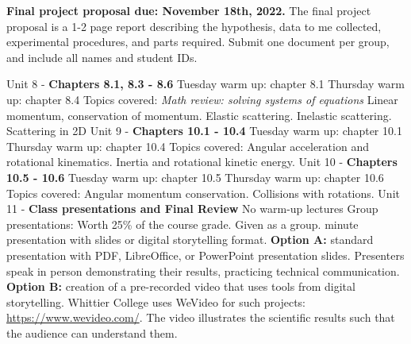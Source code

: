 \documentclass[10pt]{article}
\begin{document}
\begin{outline}[enumerate]
\1 \textbf{Final project proposal due: November 18th, 2022.}  The final project proposal is a 1-2 page report describing the hypothesis, data to me collected, experimental procedures, and parts required.  Submit one document per group, and include all names and student IDs.

\1 Unit 8 - \textbf{Chapters 8.1, 8.3 - 8.6}
\2 Tuesday warm up: chapter 8.1
\2 Thursday warm up: chapter 8.4
\2 Topics covered:
\3 \textit{Math review: solving systems of equations}
\3 Linear momentum, conservation of momentum.
\3 Elastic scattering.
\3 Inelastic scattering.
\3 Scattering in 2D
\1 Unit 9 - \textbf{Chapters 10.1 - 10.4}
\2 Tuesday warm up: chapter 10.1
\2 Thursday warm up: chapter 10.4
\2 Topics covered:
\3 Angular acceleration and rotational kinematics.
\3 Inertia and rotational kinetic energy.
\1 Unit 10 - \textbf{Chapters 10.5 - 10.6}
\2 Tuesday warm up: chapter 10.5
\2 Thursday warm up: chapter 10.6
\2 Topics covered:
\3 Angular momentum conservation.
\3 Collisions with rotations.
\1 Unit 11 - \textbf{Class presentations and Final Review}
\2 No warm-up lectures
\2 Group presentations:
\3 Worth 25\% of the course grade.
\3 Given as a group.
 minute presentation with slides or digital storytelling format.
\3 \textbf{Option A:} standard presentation with PDF, LibreOffice, or PowerPoint presentation slides. Presenters speak in person demonstrating their results, practicing technical communication.
\3 \textbf{Option B:} creation of a pre-recorded video that uses tools from digital storytelling.  Whittier College uses WeVideo for such projects: \url{https://www.wevideo.com/}.  The video illustrates the scientific results such that the audience can understand them.
\end{outline}
\end{document}
